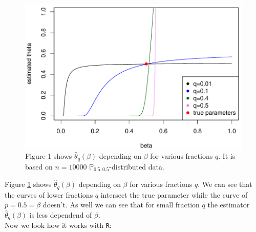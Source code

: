 \documentclass[10pt, a4paper]{article}\usepackage[]{graphicx}\usepackage[]{color}
\newenvironment{knitrout}{}{} %
\begin{document}
\begin{figure} 
\begin{knitrout}
\color{fgcolor}

{\centering \includegraphics[width=.6\linewidth]{figure/minimal-plot1_-1} 

}



\end{knitrout}
\vspace{-0.4cm}
\caption{Figure 1 shows $\hat{\theta}_q(\beta)$ depending on $\beta$ for various fractions $q$. It is based on $n=10000$ $\mathbb{P}_{0.5,0.5}$-distributed data.}
\label{fig1}
\end{figure}
Figure \ref{fig1} shows $\hat{\theta}_q(\beta)$ depending on $\beta$ for various fractions $q$. We can see that the curves of lower fractions $q$ intersect the true parameter while the curve of $p=0.5=\beta$ doesn't. As well we can see that for small fraction $q$ the estimator $\hat{\theta}_q(\beta)$ is less dependend of $\beta$.
\\
Now we look how it works with \texttt{R}:
\end{document}
